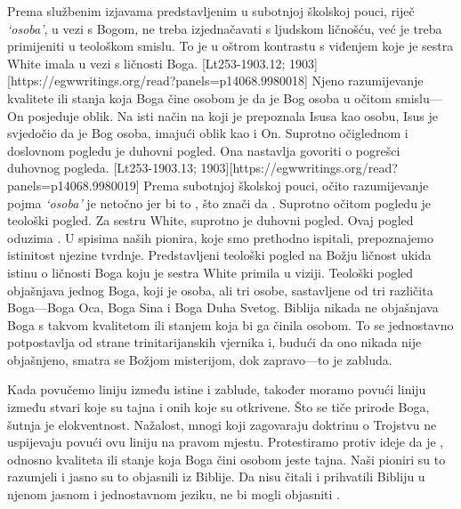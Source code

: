 Prema službenim izjavama predstavljenim u subotnjoj školskoj pouci, riječ \textit{‘osoba’}, u vezi s Bogom, ne treba izjednačavati s ljudskom ličnošću, već je treba primijeniti u teološkom smislu. To je u oštrom kontrastu s viđenjem koje je sestra White imala u vezi s ličnosti Boga. [Lt253-1903.12; 1903][https://egwwritings.org/read?panels=p14068.9980018] Njeno razumijevanje kvalitete ili stanja koja Boga čine osobom je da je Bog osoba u očitom smislu—On posjeduje oblik. Na isti način na koji je prepoznala Isusa kao osobu, Isus je svjedočio da je Bog osoba, imajući oblik kao i On. Suprotno očiglednom i doslovnom pogledu je duhovni pogled. Ona nastavlja govoriti o pogrešci duhovnog pogleda. [Lt253-1903.13; 1903][https://egwwritings.org/read?panels=p14068.9980019] Prema subotnjoj školskoj pouci, očito razumijevanje pojma \textit{‘osoba’} je netočno jer bi to , što znači da . Suprotno očitom pogledu je teološki pogled. Za sestru White, suprotno je duhovni pogled. Ovaj pogled oduzima . U spisima naših pionira, koje smo prethodno ispitali, prepoznajemo istinitost njezine tvrdnje. Predstavljeni teološki pogled na Božju ličnost ukida istinu o ličnosti Boga koju je sestra White primila u viziji. Teološki pogled objašnjava jednog Boga, koji je osoba, ali tri osobe, sastavljene od tri različita Boga—Boga Oca, Boga Sina i Boga Duha Svetog. Biblija nikada ne objašnjava Boga s takvom kvalitetom ili stanjem koja bi ga činila osobom. To se jednostavno potpostavlja od strane trinitarijanskih vjernika i, budući da ono nikada nije objašnjeno, smatra se Božjom misterijom, dok zapravo—to je zabluda.

Kada povučemo liniju između istine i zablude, također moramo povući liniju između stvari koje su tajna i onih koje su otkrivene. Što se tiče prirode Boga, šutnja je elokventnost. Nažalost, mnogi koji zagovaraju doktrinu o Trojstvu ne uspijevaju povući ovu liniju na pravom mjestu. Protestiramo protiv ideje da je , odnosno kvaliteta ili stanje koja Boga čini osobom jeste tajna. Naši pioniri su to razumjeli i jasno su to objasnili iz Biblije. Da nisu čitali i prihvatili Bibliju u njenom jasnom i jednostavnom jeziku, ne bi mogli objasniti .


